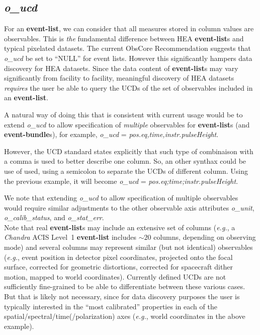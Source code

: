 \documentclass[11pt,a4paper]{ivoa}
\begin{document}
\subsection{{\em o\_ucd}}

For an {\bf event-list}, we can consider that all measures stored in column values are observables. This is {\em the\/} fundamental difference between \gls{HEA} {\bf event-list}s and typical pixelated datasets. The current ObsCore Recommendation suggests that {\em o\_ucd\/} be set to ``NULL'' for event lists. However this significantly hampers data discovery for \gls{HEA} datasets. Since the data content of {\bf event-list}s may vary significantly from facility to facility, meaningful discovery of \gls{HEA} datasets {\em requires\/} the user be able to query the UCDs of the set of observables included in an {\bf event-list}.

A natural way of doing this that is consistent with current usage would be to extend {\em o\_ucd\/} to allow specification of {\em multiple\/} observables for {\bf event-list}s (and {\bf event-bundle}s), for example, {\em o\_ucd\/} = {\em pos.eq,time,instr.pulseHeight\/}.

However, the UCD standard \citep{2005ivoa.spec.0819D} states explicitly that such type of combinaison with a comma is used to better describe one column. So, an other synthax could be use of used, using a semicolon to separate the UCDs of different column. Using the previous example, it will become {\em o\_ucd\/} = {\em pos.eq;time;instr.pulseHeight\/}.

We note that extending {\em o\_ucd\/} to allow specification of multiple observables would require similar adjustments to the other observable axis attributes {\em o\_unit}, {\em o\_calib\_status}, and {\em o\_stat\_err}.\\

Note that real {\bf event-list}s may include an extensive set of columns ({\em e.g.\/}, a {\em Chandra\/} ACIS Level~1 {\bf event-list} includes $\sim\!20$ columns, depending on observing mode) and several columns may represent similar (but not identical) observables ({\em e.g.\/}, event position in detector pixel coordinates, projected onto the focal surface, corrected for geometric distortions, corrected for spacecraft dither motion, mapped to world coordinates).  Currently defined UCDs are not sufficiently fine-grained to be able to differentiate between these various cases. But that is likely not necessary, since for data discovery purposes the user is typically interested in the ``most calibrated'' properties in each of the spatial/spectral/time(/polarization) axes ({\em e.g.\/}, world coordinates in the above example).
\end{document}
